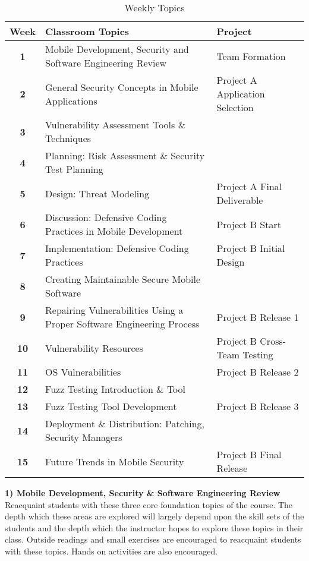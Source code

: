 \documentclass[conference]{IEEEtran}
\begin{document}
\begin{table*}[t]
  \centering
  \caption{Weekly Topics}
     \begin{tabular}{ c | l | l }
 \bfseries Week & \bfseries Classroom Topics & \bfseries Project  \\ \hline \hline
	\bfseries 1 & Mobile Development, Security and Software Engineering Review & Team Formation \\ \hline
	\bfseries 2 & General Security Concepts in Mobile Applications & Project A  Application Selection \\ \hline
	\bfseries 3 & Vulnerability Assessment Tools \& Techniques &  \\ \hline
	\bfseries 4 & Planning: Risk Assessment \& Security Test Planning &  \\ \hline
	\bfseries 5 & Design: Threat Modeling & Project A Final Deliverable \\ \hline
	\bfseries 6 & Discussion: Defensive Coding Practices in Mobile Development & Project B Start  \\ \hline
	\bfseries 7 & Implementation: Defensive Coding Practices &  Project B Initial Design\\ \hline	
	\bfseries 8 & Creating Maintainable Secure Mobile Software &  \\ \hline
	\bfseries 9 & Repairing Vulnerabilities Using a Proper Software Engineering Process & Project B Release 1  \\ \hline
	\bfseries 10 & Vulnerability Resources & Project B Cross-Team Testing \\ \hline
	\bfseries 11 & OS Vulnerabilities & Project B Release 2 \\ \hline
	\bfseries 12 & Fuzz Testing Introduction \& Tool &  \\ \hline
	\bfseries 13 & Fuzz Testing Tool Development &  Project B Release 3 \\ \hline
	\bfseries 14 & Deployment \& Distribution: Patching, Security Managers &  \\ \hline
	\bfseries 15 & Future Trends in Mobile Security & Project B Final Release \\
  \end{tabular}
  \label{table:weeklytopics}

\end{table*}

\textbf{1) Mobile Development, Security \& Software Engineering Review}\\
Reacquaint students with these three core foundation topics of the course. The depth which these areas are explored will largely depend upon the skill sets of the students and the depth which the instructor hopes to explore these topics in their class. Outside readings and small exercises are encouraged to reacquaint students with these topics. Hands on activities are also encouraged. \\
\end{document}
